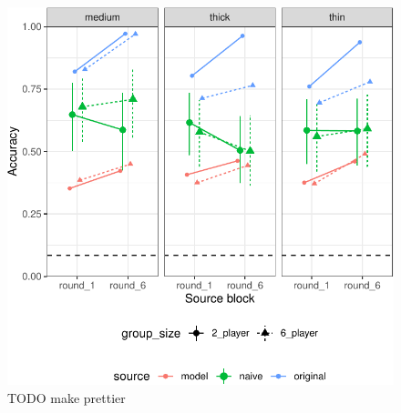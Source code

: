 \documentclass[10pt, letterpaper]{article}
\begin{document}
\begin{CodeChunk}
\begin{figure}[t]

{\centering \includegraphics[width=1\linewidth]{figs/fig-1-1} 

}

\caption[TODO make prettier \label{TODO}]{TODO make prettier \label{TODO}}\label{fig:fig-1}
\end{figure}
\end{CodeChunk}
\end{document}
